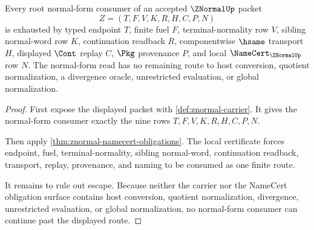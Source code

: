 \begin{theorem}
\label{thm:znormal-root-normal-form-consumer-exhaustion}
Every root normal-form consumer of an accepted $\ZNormalUp$ packet
$$
Z=(T,F,V,K,R,H,C,P,N)
$$
is exhausted by typed endpoint $T$, finite fuel $F$, terminal-normality row $V$, sibling normal-word row $K$, continuation readback $R$, componentwise $\hsame$ transport $H$, displayed $\Cont$ replay $C$, $\Pkg$ provenance $P$, and local $\NameCert_{\ZNormalUp}$ row $N$. The normal-form read has no remaining route to host conversion, quotient normalization, a divergence oracle, unrestricted evaluation, or global normalization.
\end{theorem}
\begin{proof}
First expose the displayed packet with \autoref{def:znormal-carrier}. It gives the normal-form consumer exactly the nine rows $T,F,V,K,R,H,C,P,N$.

Then apply \autoref{thm:znormal-namecert-obligations}. The local certificate forces endpoint, fuel, terminal-normality, sibling normal-word, continuation readback, transport, replay, provenance, and naming to be consumed as one finite route.

It remains to rule out escape. Because neither the carrier nor the NameCert obligation surface contains host conversion, quotient normalization, divergence, unrestricted evaluation, or global normalization, no normal-form consumer can continue past the displayed route.
\end{proof}

